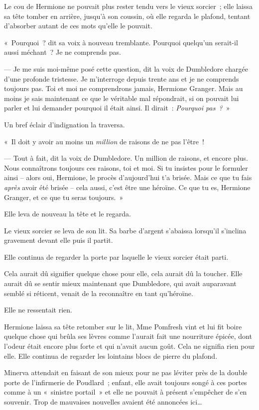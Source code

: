 Le cou de Hermione ne pouvait plus rester tendu vers le vieux sorcier~; elle laissa sa tête tomber en arrière, jusqu'à son coussin, où elle regarda le plafond, tentant d'absorber autant de ces mots qu'elle le pouvait.

«~Pourquoi~? dit sa voix à nouveau tremblante.
Pourquoi quelqu'un serait-il aussi méchant~?
Je ne comprends pas.

--- Je me suis moi-même posé cette question, dit la voix de Dumbledore chargée d'une profonde tristesse.
Je m'interroge depuis trente ans et je ne comprends toujours pas.
Toi et moi ne comprendrons jamais, Hermione Granger.
Mais au moins je sais maintenant ce que le véritable mal répondrait, si on pouvait lui parler et lui demander pourquoi il était ainsi.
Il dirait~: \emph{Pourquoi pas~?}~»

Un bref éclair d'indignation la traversa.

«~Il doit y avoir au moins un \emph{million} de raisons de ne pas l'être~!

--- Tout à fait, dit la voix de Dumbledore.
Un million de raisons, et encore plus.
Nous connaîtrons toujours ces raisons, toi et moi.
Si tu insistes pour le formuler ainsi -- alors oui, Hermione, le procès d'aujourd'hui t'a brisée.
Mais ce que tu fais \emph{après} avoir été brisée -- cela aussi, c'est être une héroïne.
Ce que tu es, Hermione Granger, et ce que tu seras toujours.~»

Elle leva de nouveau la tête et le regarda.

Le vieux sorcier se leva de son lit.
Sa barbe d'argent s'abaissa lorsqu'il s'inclina gravement devant elle puis il partit.

Elle continua de regarder la porte par laquelle le vieux sorcier était parti.

Cela aurait dû signifier quelque chose pour elle, cela aurait dû la toucher.
Elle aurait dû se sentir mieux maintenant que Dumbledore, qui avait auparavant semblé si réticent, venait de la reconnaître en tant qu'héroïne.

Elle ne ressentait rien.

Hermione laissa sa tête retomber sur le lit, Mme Pomfresh vint et lui fit boire quelque chose qui brûla ses lèvres comme l'aurait fait une nourriture épicée, dont l'odeur était encore plus forte et qui n'avait aucun goût.
Cela ne signifia rien pour elle.
Elle continua de regarder les lointains blocs de pierre du plafond.

\later

Minerva attendait en faisant de son mieux pour ne pas léviter près de la double porte de l'infirmerie de Poudlard~; enfant, elle avait toujours songé à ces portes comme à un «~sinistre portail~» et elle ne pouvait à présent s'empêcher de s'en souvenir.
Trop de mauvaises nouvelles avaient été annoncées ici…

